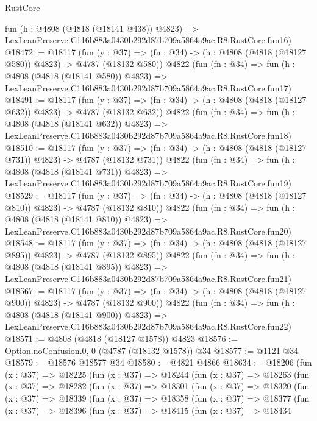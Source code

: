 \begin{lexlean}{RustCore}
\begin{coremodule}
    fun (h : @4808 (@4818 (@18141 @438)) @4823) =>
    LexLeanPreserve.C116b883a0430b292d87b709a5864a9ac.R8.RustCore.fun16)
@18472 := @18117
    (fun (y : @37) => (fn : @34) -> (h : @4808 (@4818 (@18127 @580)) @4823) -> @4787 (@18132 @580))
    @4822
    (fun (fn : @34) =>
    fun (h : @4808 (@4818 (@18141 @580)) @4823) =>
    LexLeanPreserve.C116b883a0430b292d87b709a5864a9ac.R8.RustCore.fun17)
@18491 := @18117
    (fun (y : @37) => (fn : @34) -> (h : @4808 (@4818 (@18127 @632)) @4823) -> @4787 (@18132 @632))
    @4822
    (fun (fn : @34) =>
    fun (h : @4808 (@4818 (@18141 @632)) @4823) =>
    LexLeanPreserve.C116b883a0430b292d87b709a5864a9ac.R8.RustCore.fun18)
@18510 := @18117
    (fun (y : @37) => (fn : @34) -> (h : @4808 (@4818 (@18127 @731)) @4823) -> @4787 (@18132 @731))
    @4822
    (fun (fn : @34) =>
    fun (h : @4808 (@4818 (@18141 @731)) @4823) =>
    LexLeanPreserve.C116b883a0430b292d87b709a5864a9ac.R8.RustCore.fun19)
@18529 := @18117
    (fun (y : @37) => (fn : @34) -> (h : @4808 (@4818 (@18127 @810)) @4823) -> @4787 (@18132 @810))
    @4822
    (fun (fn : @34) =>
    fun (h : @4808 (@4818 (@18141 @810)) @4823) =>
    LexLeanPreserve.C116b883a0430b292d87b709a5864a9ac.R8.RustCore.fun20)
@18548 := @18117
    (fun (y : @37) => (fn : @34) -> (h : @4808 (@4818 (@18127 @895)) @4823) -> @4787 (@18132 @895))
    @4822
    (fun (fn : @34) =>
    fun (h : @4808 (@4818 (@18141 @895)) @4823) =>
    LexLeanPreserve.C116b883a0430b292d87b709a5864a9ac.R8.RustCore.fun21)
@18567 := @18117
    (fun (y : @37) => (fn : @34) -> (h : @4808 (@4818 (@18127 @900)) @4823) -> @4787 (@18132 @900))
    @4822
    (fun (fn : @34) =>
    fun (h : @4808 (@4818 (@18141 @900)) @4823) =>
    LexLeanPreserve.C116b883a0430b292d87b709a5864a9ac.R8.RustCore.fun22)
@18571 := @4808 (@4818 (@18127 @1578)) @4823
@18576 := Option.noConfusion.{0, 0} (@4787 (@18132 @1578)) @34
@18577 := @1121 @34
@18579 := @18576 @18577 @34
@18580 := @4821 @4866
@18634 := @18206
    (fun (x : @37) =>
    @18225
      (fun (x : @37) =>
      @18244
        (fun (x : @37) =>
        @18263
          (fun (x : @37) =>
          @18282
            (fun (x : @37) =>
            @18301
              (fun (x : @37) =>
              @18320
                (fun (x : @37) =>
                @18339
                  (fun (x : @37) =>
                  @18358
                    (fun (x : @37) =>
                    @18377
                      (fun (x : @37) =>
                      @18396
                        (fun (x : @37) =>
                        @18415
                          (fun (x : @37) =>
                          @18434

\end{coremodule}
\end{lexlean}
